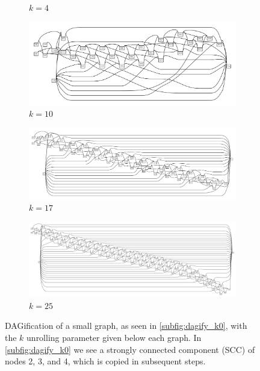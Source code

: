 \begin{figure}[htbp!]
\begin{subfigure}[t]{0.49\textwidth}
    \caption{$k=4$} \label{subfig:dagify_k4}
  \end{subfigure}
  \begin{subfigure}[t]{0.49\textwidth}
    \includegraphics[width=1.0\textwidth]{Chapter2/Figs/loopy_dagify10.pdf}
    \caption{$k=10$} \label{subfig:dagify_k10}
  \end{subfigure}
  \begin{subfigure}[t]{0.49\textwidth}
    \includegraphics[width=1.0\textwidth]{Chapter2/Figs/loopy_dagify17.pdf}
    \caption{$k=17$} \label{subfig:dagify_k17}
  \end{subfigure}
  \begin{subfigure}[t]{0.49\textwidth}
    \includegraphics[width=1.0\textwidth]{Chapter2/Figs/loopy_dagify25.pdf}
    \caption{$k=25$} \label{subfig:dagify_k25}
  \end{subfigure}
  \caption[DAGification]{
    DAGification of a small graph, as seen in \ref{subfig:dagify_k0}, with the $k$ unrolling parameter given below each graph.
    In \ref{subfig:dagify_k0} we see a strongly connected component (SCC) of nodes 2, 3, and 4, which is copied in subsequent steps.
}
\end{figure}
